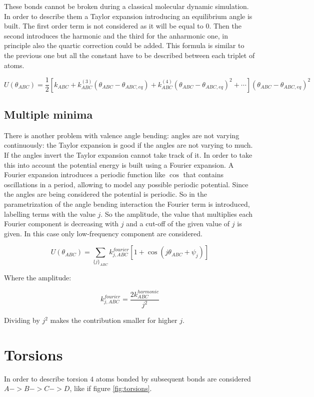 These bonds cannot be broken during a classical molecular dynamic simulation.
In order to describe them a Taylor expansion introducing an equilibrium angle is built.
The first order term is not considered as it will be equal to $0$.
Then the second introduces the harmonic and the third for the anharmonic one, in principle also the quartic correction could be added.
This formula is similar to the previous one but all the constant have to be described between each triplet of atoms.

$$U(\theta_{ABC}) = \frac{1}{2}[k_{ABC}+k^{(3)}_{ABC}(\theta_{ABC}-\theta_{ABC,eq})+k^{(4)}_{ABC}(\theta_{ABC}-\theta_{ABC,eq})^2+\cdots](\theta_{ABC}-\theta_{ABC, eq})^2$$

	\subsection{Multiple minima}
	There is another problem with valence angle bending: angles are not varying continuously: the Taylor expansion is good if the angles are not varying to much.
	If the angles invert the Taylor expansion cannot take track of it.
	In order to take this into account the potential energy is built using a Fourier expansion.
	A Fourier expansion introduces a periodic function like $\cos$ that contains oscillations in a period, allowing to model any possible periodic potential.
	Since the angles are being considered the potential is periodic.
	So in the parametrization of the angle bending interaction the Fourier term is introduced, labelling terms with the value $j$.
	So the amplitude, the value that multiplies each Fourier component is decreasing with $j$ and a cut-off of the given value of $j$ is given.
	In this case only low-frequency component are considered.

	$$U(\theta_{ABC}) = \sum\limits_{\{j\}_{ABC}}k^{fourier}_{j,ABC}[1+\cos(j\theta_{ABC}+\psi_j)]$$

	Where the amplitude:

	$$k_{j, ABC}^{fourier} = \frac{2k^{harmonic}_{ABC}}{j^2}$$

	Dividing by $j^2$ makes the contribution smaller for higher $j$.

\section{Torsions}
In order to describe torsion $4$ atoms bonded by subsequent bonds are considered $A->B->C->D$, like if figure \ref{fig:torsions}.

